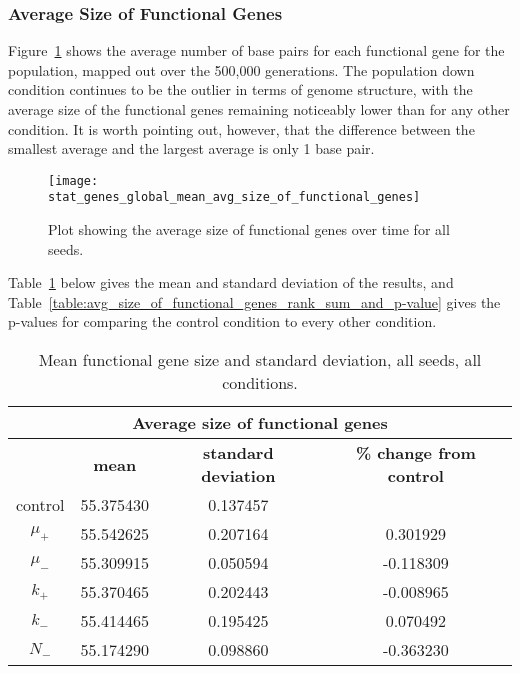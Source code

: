 \subsubsection{Average Size of Functional Genes}\label{sec:average_size_functional_genes}
Figure~\ref{fig:mean_functional_gene_size} shows the average number of base pairs for each functional gene for the population, mapped out over the 500,000 generations. The population down condition continues to be the outlier in terms of genome structure, with the average size of the functional genes remaining noticeably lower than for any other condition. It is worth pointing out, however, that the difference between the smallest average and the largest average is only 1 base pair. 
\begin{figure}[H]
	\centering
	\texttt{[image: stat\_genes\_global\_mean\_avg\_size\_of\_functional\_genes]}
	\caption[Average size of functional genes]{Plot showing the average size of functional genes over time for all seeds.}
	\label{fig:mean_functional_gene_size}
\end{figure}
Table~\ref{table:mean_functional_gene_size_and_std_dev} below gives the mean and standard deviation of the results, and Table~\ref{table:avg_size_of_functional_genes_rank_sum_and_p-value} gives the p-values for comparing the control condition to every other condition. 

\begin{table}[H]
	\centering
	\begin{tabular}{|c|c|c|c|}
		\hline
		\multicolumn{4}{c}{\Large \textbf{Average size of functional genes}} \\
		\hline
		& \textbf{mean} & \textbf{standard deviation} & \textbf{\% change from control} \\
		\hline
		control & 55.375430 & 0.137457 & \textemdash \\ 
		\hline
		$\mu_+$ & 55.542625 & 0.207164 & 0.301929 \\ 
		\hline
		$\mu_-$ & 55.309915 & 0.050594 & -0.118309 \\ 
		\hline
		$k_+$ & 55.370465 & 0.202443 & -0.008965 \\ 
		\hline
		$k_-$ & 55.414465 & 0.195425 & 0.070492 \\ 
		\hline
		$N_-$ & 55.174290 & 0.098860 & -0.363230 \\ 
		\hline
	\end{tabular}
	\caption[Mean functional gene size and standard deviation]{Mean functional gene size and standard deviation, all seeds, all conditions.}
	\label{table:mean_functional_gene_size_and_std_dev}
\end{table}

